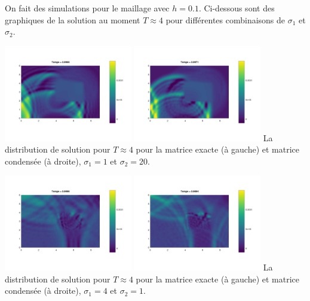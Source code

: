 \documentclass[12pt]{article}
\begin{document}
On fait des simulations pour le maillage avec $h=0.1$. Ci-dessous sont des graphiques de la solution au moment $T \approx 4$ pour différentes combinaisons de $\sigma_1$ et $\sigma_2$.
\begin{center}
	\hspace{1cm}\includegraphics[width=0.42\textwidth]{images/u_deux_mil_1_20}\hspace{1cm}
	\includegraphics[width=0.42\textwidth]{images/u_deux_mil_1_20_cond}\hspace{1cm}
 {La distribution de solution pour $T \approx 4$ pour la matrice exacte (à gauche) et matrice condensée (à droite), $\sigma_1 = 1$ et $\sigma_2 = 20$.}
\end{center}
\begin{center}
	\hspace{1cm}\includegraphics[width=0.42\textwidth]{images/u_deux_mil_4_1}\hspace{1cm}
	\includegraphics[width=0.42\textwidth]{images/u_deux_mil_4_1_cond}\hspace{1cm}
	{La distribution de solution pour $T \approx 4$ pour la matrice exacte (à gauche) et matrice condensée (à droite), $\sigma_1 = 4$ et $\sigma_2 = 1$.}
\end{center}
\end{document}
